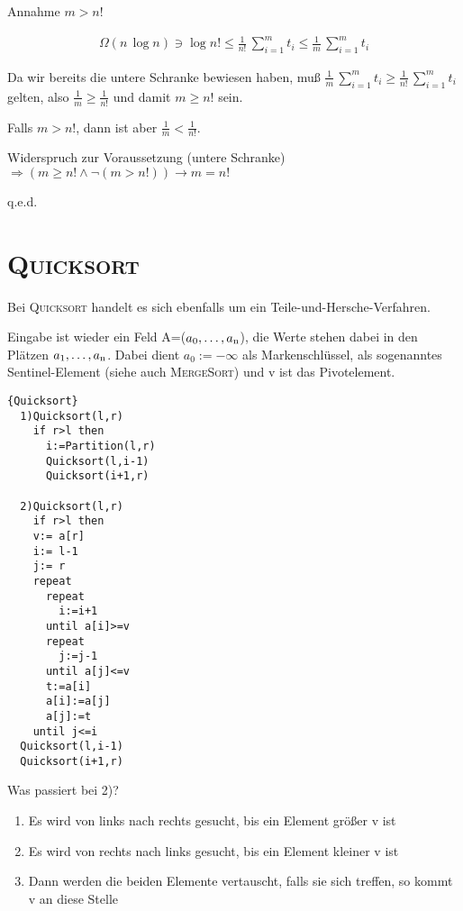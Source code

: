 \begin{beweis}
Annahme $m>n!$

\begin{gather*}
\Omega(n\, \log n) \ni \log n!\leq\frac{1}{n!}\, \sum_{i=1}^{m}t_i \leq\frac{1}{m}\, \sum_{i=1}^{m}t_i
\end{gather*}

Da wir bereits die untere Schranke bewiesen haben, muß \(\frac{1}{m}\, \sum_{i=1}^{m}t_i \geq \frac{1}{n!}\, \sum_{i=1}^{m}t_i\) gelten,
also \(\frac{1}{m} \geq \frac{1}{n!}\) und damit \(m \geq n!\) sein.

Falls \(m>n!\), dann ist aber \(\frac{1}{m} < \frac{1}{n!}\).

Widerspruch zur Voraussetzung (untere Schranke) \(\Rightarrow (m \geq n! \wedge \lnot (m>n!)) \rightarrow m=n!\)
\end{beweis}
\hfill q.e.d.

\section{\textsc{Quicksort}}
Bei \textsc{Quicksort} handelt es sich ebenfalls um ein Teile-und-Hersche-Verfahren.

Eingabe ist wieder ein Feld A=(\(a_0, \ldots, a_{\textup{n}}\)), die Werte stehen dabei in den Plätzen \(a_1, \ldots, a_{\textup{n}}\).
Dabei dient $a_0:=-\infty$ als Markenschlüssel, als sogenanntes Sentinel-Element (siehe auch \textsc{MergeSort}) und
v ist das Pivotelement.

\begin{Algorithmus}[H]
\begin{lstlisting}[frame=tlrb, mathescape=true, title=\textsc{Quicksort}, gobble=2]{Quicksort}
  1)Quicksort(l,r)
    if r>l then
      i:=Partition(l,r)
      Quicksort(l,i-1)
      Quicksort(i+1,r) 

  2)Quicksort(l,r)
    if r>l then
    v:= a[r] 
    i:= l-1 
    j:= r
    repeat
      repeat 
        i:=i+1 
      until a[i]>=v
      repeat 
        j:=j-1 
      until a[j]<=v
      t:=a[i]  
      a[i]:=a[j] 
      a[j]:=t
    until j<=i
  Quicksort(l,i-1)
  Quicksort(i+1,r) 
\end{lstlisting}
\end{Algorithmus}

Was passiert bei 2)?
\begin{enumerate}
\item Es wird von links nach rechts gesucht, bis ein Element größer v ist
\item Es wird von rechts nach links gesucht, bis ein Element kleiner v ist
\item Dann werden die beiden Elemente vertauscht, falls sie sich treffen, so kommt v an diese Stelle
\end{enumerate}

